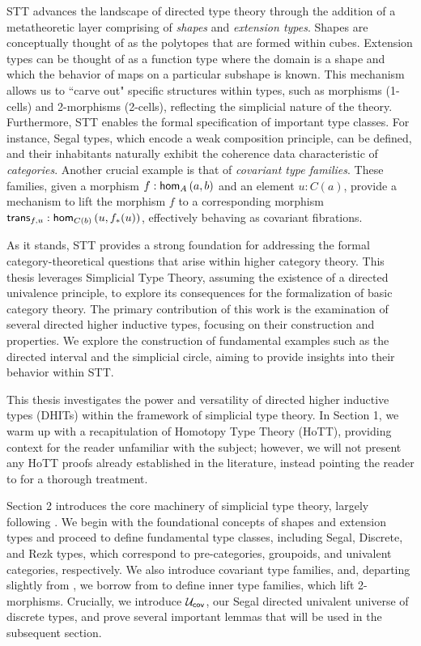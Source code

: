 \documentclass[main.tex]{subfiles}
\begin{document}
STT advances the landscape of directed type theory through the addition of a metatheoretic layer comprising of \textit{shapes} and \textit{extension types}. Shapes are conceptually thought of as the polytopes that are formed within cubes. Extension types can be thought of as a function type where the domain is a shape and which the behavior of maps on a particular subshape is known. This mechanism allows us to ``carve out" specific structures within types, such as morphisms (1-cells) and 2-morphisms (2-cells), reflecting the simplicial nature of the theory. Furthermore, STT enables the formal specification of important type classes. For instance, Segal types, which encode a weak composition principle, can be defined, and their inhabitants naturally exhibit the coherence data characteristic of \textit{categories}. Another crucial example is that of \textit{covariant type families}. These families, given a morphism $f : \ho[A]{a}{b}$ and an element $u : C(a)$, provide a mechanism to lift the morphism $f$ to a corresponding morphism $\trans{f}{u}:\ho[C(b)]{u}{f_*(u)}$, effectively behaving as covariant fibrations.

As it stands, STT provides a strong foundation for addressing the formal category-theoretical questions that arise within higher category theory. This thesis leverages Simplicial Type Theory, assuming the existence of a directed univalence principle, to explore its consequences for the formalization of basic category theory. The primary contribution of this work is the examination of several directed higher inductive types, focusing on their construction and properties. We explore the construction of fundamental examples such as the directed interval and the simplicial circle, aiming to provide insights into their behavior within STT.

This thesis investigates the power and versatility of directed higher inductive types (DHITs) within the framework of simplicial type theory. In Section 1, we warm up with a recapitulation of Homotopy Type Theory (HoTT), providing context for the reader unfamiliar with the subject; however, we will not present any HoTT proofs already established in the literature, instead pointing the reader to \cite{program_homotopy_2013} for a thorough treatment. 

Section 2 introduces the core machinery of simplicial type theory, largely following \cite{riehl_type_2017}. We begin with the foundational concepts of shapes and extension types and proceed to define fundamental type classes, including Segal, Discrete, and Rezk types, which correspond to pre-categories, groupoids, and univalent categories, respectively. We also introduce covariant type families, and, departing slightly from \cite{riehl_type_2017}, we borrow from \cite{buchholtz_synthetic_2022} to define inner type families, which lift 2-morphisms. Crucially, we introduce $\uc$, our Segal directed univalent universe of discrete types, and prove several important lemmas that will be used in the subsequent section. 
\end{document}
